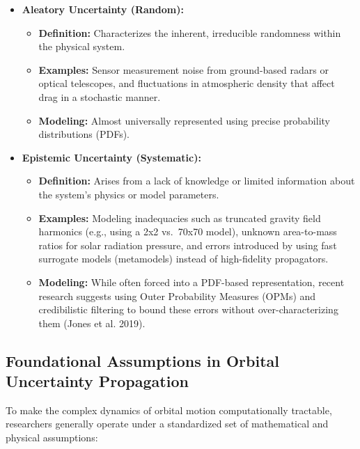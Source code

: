 \documentclass[
  letterpaper,
  DIV=11,
  numbers=noendperiod,
  oneside]{scrartcl}
\begin{document}
\begin{itemize}
\item
  \textbf{Aleatory Uncertainty (Random):}

  \begin{itemize}
  \item
    \textbf{Definition:} Characterizes the inherent, irreducible
    randomness within the physical system.
  \item
    \textbf{Examples:} Sensor measurement noise from ground-based radars
    or optical telescopes, and fluctuations in atmospheric density that
    affect drag in a stochastic manner.
  \item
    \textbf{Modeling:} Almost universally represented using precise
    probability distributions (PDFs).
  \end{itemize}
\item
  \textbf{Epistemic Uncertainty (Systematic):}

  \begin{itemize}
  \item
    \textbf{Definition:} Arises from a lack of knowledge or limited
    information about the system's physics or model parameters.
  \item
    \textbf{Examples:} Modeling inadequacies such as truncated gravity
    field harmonics (e.g., using a 2x2 vs.~70x70 model), unknown
    area-to-mass ratios for solar radiation pressure, and errors
    introduced by using fast surrogate models (metamodels) instead of
    high-fidelity propagators.
  \item
    \textbf{Modeling:} While often forced into a PDF-based
    representation, recent research suggests using Outer Probability
    Measures (OPMs) and credibilistic filtering to bound these errors
    without over-characterizing them (Jones et al. 2019).
  \end{itemize}
\end{itemize}

\subsection{Foundational Assumptions in Orbital Uncertainty
Propagation}\label{foundational-assumptions-in-orbital-uncertainty-propagation}

To make the complex dynamics of orbital motion computationally
tractable, researchers generally operate under a standardized set of
mathematical and physical assumptions:
\end{document}
